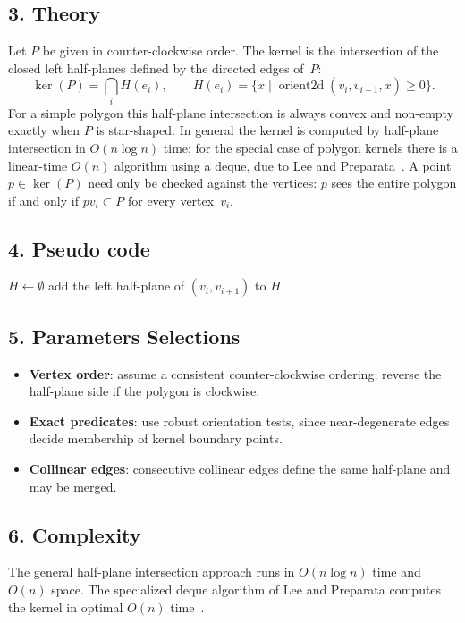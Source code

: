 \subsection{3. Theory}
Let $P$ be given in counter-clockwise order. The kernel is the intersection of the closed left half-planes defined by the directed edges of~$P$:
\[
\ker(P) = \bigcap_{i} H(e_i),\qquad
H(e_i) = \{x \mid \operatorname{orient2d}(v_i, v_{i+1}, x) \ge 0\}.
\]
For a simple polygon this half-plane intersection is always convex and non-empty exactly when $P$ is star-shaped. In general the kernel is computed by half-plane intersection in $O(n \log n)$ time; for the special case of polygon kernels there is a linear-time $O(n)$ algorithm using a deque, due to Lee and Preparata~\cite{lee1979}. A point $p \in \ker(P)$ need only be checked against the vertices: $p$ sees the entire polygon if and only if $\overline{pv_i} \subset P$ for every vertex~$v_i$.

\subsection{4. Pseudo code}
\begin{algorithmic}
    \State $H \gets \emptyset$
        \State add the left half-plane of $(v_i, v_{i+1})$ to $H$
    \EndFor
    \State \Return {}
\EndFunction
\end{algorithmic}

\subsection{5. Parameters Selections}
\begin{itemize}
    \item \textbf{Vertex order}: assume a consistent counter-clockwise ordering; reverse the half-plane side if the polygon is clockwise.
    \item \textbf{Exact predicates}: use robust orientation tests, since near-degenerate edges decide membership of kernel boundary points.
    \item \textbf{Collinear edges}: consecutive collinear edges define the same half-plane and may be merged.
\end{itemize}

\subsection{6. Complexity}
The general half-plane intersection approach runs in $O(n \log n)$ time and $O(n)$ space. The specialized deque algorithm of Lee and Preparata computes the kernel in optimal $O(n)$ time~\cite{lee1979}.

